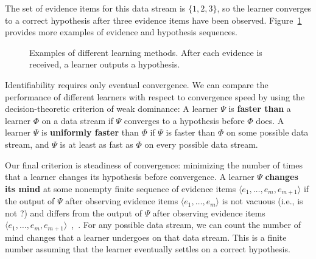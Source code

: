 \documentclass{elsarticle}%
\newcommand{\learnera}{\Psi}
\newcommand{\learnerb}{\Phi}
\begin{document}
The set of evidence items for this data stream is $\{1,2,3\}$, so the learner converges to a correct hypothesis after three evidence items have been observed. Figure~\ref{fig:learners} provides more examples of evidence and hypothesis sequences.

\begin{figure}[htbp]
\centering
{}
\caption{Examples of different learning methods. After each evidence is received, a learner outputs a hypothesis.}
\label{fig:learners}
\end{figure}


Identifiability requires only eventual convergence. We can compare the performance of different learners with respect to convergence speed by using the decision-theoretic criterion of weak dominance: A learner $\learnera$ is \textbf{faster than} a learner $\learnerb$ on a data stream if $\learnera$ converges to a hypothesis before $\learnerb$ does. A learner $\learnera$ is \textbf{uniformly faster} than $\learnerb$ if $\learnera$ is faster than $\learnerb$ on some possible data stream, and $\learnera$ is at least as fast as $\learnerb$ on every possible data stream.

Our final criterion is steadiness of convergence: minimizing the number of times that a learner changes its hypothesis before convergence. A learner $\learnera$ \textbf{changes its mind} at some nonempty finite sequence of evidence items $\langle e_{1},\ldots,e_{m},e_{m+1}\rangle$ if the output of $\learnera$ after observing evidence items $\langle e_{1},\ldots,e_{m}\rangle$ is not vacuous (i.e., is not ?) and differs from the output of $\learnera$ after observing evidence items $\langle e_{1},\ldots,e_{m},e_{m+1}\rangle$~\cite[Ch.12.2]{jain99:_system_that_learn},~\cite{putnam65:_trial_error_predic_solut_probl_mostow,bib:kev-causal}. For any possible data stream, we can count the number of mind changes that a learner undergoes on that data stream. This is a finite number assuming that the learner eventually settles on a correct hypothesis. 
\end{document}
